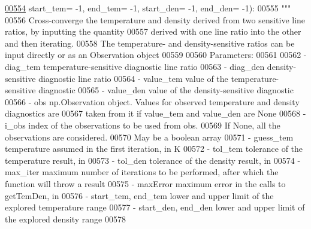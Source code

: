 \begin{DoxyCode}
\hypertarget{classpyneb_1_1core_1_1diags_1_1_diagnostics_l00554}{}\hyperlink{classpyneb_1_1core_1_1diags_1_1_diagnostics_a2b0ebbaab7ce09624c1bc930e62bc228}{00554}                        start\_tem= -1, end\_tem= -1, start\_den= -1, end\_den= -1):
00555         \textcolor{stringliteral}{"""}
00556 \textcolor{stringliteral}{        Cross-converge the temperature and density derived from two sensitive line ratios, by inputting the
       quantity }
00557 \textcolor{stringliteral}{        derived with one line ratio into the other and then iterating.}
00558 \textcolor{stringliteral}{        The temperature- and density-sensitive ratios can be input directly or as an Observation object}
00559 \textcolor{stringliteral}{    }
00560 \textcolor{stringliteral}{        Parameters:}
00561 \textcolor{stringliteral}{    }
00562 \textcolor{stringliteral}{        - diag\_tem   temperature-sensitive diagnostic line ratio}
00563 \textcolor{stringliteral}{        - diag\_den   density-sensitive diagnostic line ratio}
00564 \textcolor{stringliteral}{        - value\_tem  value of the temperature-sensitive diagnostic}
00565 \textcolor{stringliteral}{        - value\_den  value of the density-sensitive diagnostic}
00566 \textcolor{stringliteral}{        - obs        np.Observation object. Values for observed temperature and density diagnostics are}
00567 \textcolor{stringliteral}{                        taken from it if value\_tem and value\_den are None}
00568 \textcolor{stringliteral}{        - i\_obs      index of the observations to be used from obs. }
00569 \textcolor{stringliteral}{                        If None, all the observations are considered.}
00570 \textcolor{stringliteral}{                        May be a boolean array}
00571 \textcolor{stringliteral}{        - guess\_tem  temperature assumed in the first iteration, in K}
00572 \textcolor{stringliteral}{        - tol\_tem    tolerance of the temperature result, in %
00573 \textcolor{stringliteral}{        - tol\_den    tolerance of the density result, in %
00574 \textcolor{stringliteral}{        - max\_iter   maximum number of iterations to be performed, after which the function will throw a
       result}
00575 \textcolor{stringliteral}{        - maxError   maximum error in the calls to getTemDen, in %
00576 \textcolor{stringliteral}{        - start\_tem, end\_tem  lower and upper limit of the explored temperature range }
00577 \textcolor{stringliteral}{        - start\_den, end\_den  lower and upper limit of the explored density range }
00578 \textcolor{stringliteral}{    }
}}}
\end{DoxyCode}
